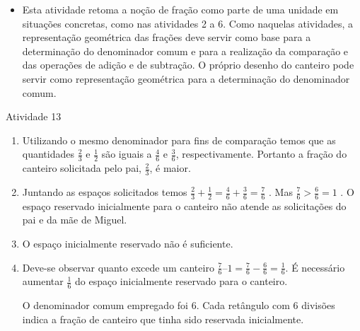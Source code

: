 \begin{multicols}{2}
  \begin{itemize} %
    \item       Esta atividade retoma a noção de fração como parte de uma unidade em situações concretas, como nas atividades 2 a 6. Como naquelas atividades, a representação geométrica das frações deve servir como base para a determinação do denominador comum e para a realização da comparação e das operações de adição e de subtração. O próprio desenho do canteiro pode servir como representação geométrica para a determinação do denominador comum.
\end{itemize} %
  
\begin{resposta*}{Atividade 13}
\begin{enumerate} [\quad a)] %
  \item     Utilizando o mesmo denominador para fins de comparação temos que as quantidades     $\frac{2}{3}$     e     $\frac{1}{2}$     são iguais a     $\frac{4}{6}$     e     $\frac{3}{6}$, respectivamente. Portanto a fração do canteiro solicitada pelo pai,     $\frac{2}{3}$, é maior. 
  \item     Juntando as espaços solicitados temos     $\frac{2}{3} + \frac{1}{2} = \frac{4}{6} + \frac{3}{6} = \frac{7}{6}$    . Mas     $\frac{7}{6}>\frac{6}{6}=1$    . O espaço reservado inicialmente para o canteiro não atende as solicitações do pai e da mãe de Miguel. 
  \item     O espaço inicialmente reservado não é suficiente. 
  \item     Deve-se observar quanto excede um canteiro  $\frac{7}{6} – 1 = \frac{7}{6} - \frac{6}{6} = \frac{1}{6}$. É necessário aumentar $\frac{1}{6}$ do espaço inicialmente reservado para o canteiro. 

O denominador comum empregado foi 6. Cada retângulo com 6 divisões indica a fração de canteiro que tinha sido reservada inicialmente. 

\begin{center}
\end{center}



\end{enumerate}
\end{resposta*}
\end{multicols}
